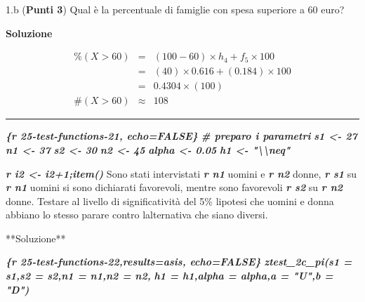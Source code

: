\documentclass[
  11pt,
]{book}
\newenvironment{Shaded}{\begin{snugshade}}{\end{snugshade}}
\newcommand{\InformationTok}[1]{\textcolor[rgb]{0.56,0.35,0.01}{\textbf{\textit{#1}}}}
\newcommand{\NormalTok}[1]{#1}
\theoremstyle{mytheoremstyle}
\theoremstyle{mydefstyle}
\begin{document}
1.b (\textbf{Punti 3}) Qual è la percentuale di famiglie con spesa superiore a 60 euro?

\textbf{Soluzione}

\begin{eqnarray*}
     \%(X> 60 ) &=& ( 100 - 60 )\times h_{ 4 }+ f_{ 5 }\times 100 \\
              &=& ( 40 )\times 0.616 + ( 0.184 )\times 100 \\
              &=&  0.4304 \times(100)\\
     \#(X> 60 ) &\approx& 108 
         \end{eqnarray*}

\begin{center}\rule{0.5\linewidth}{0.5pt}\end{center}

\begin{Shaded}
\begin{Highlighting}[]
\InformationTok{\textasciigrave{}\textasciigrave{}\textasciigrave{}\{r 25{-}test{-}functions{-}21, echo=FALSE\} }
\InformationTok{\# preparo i parametri}
\InformationTok{s1 \textless{}{-} 27}
\InformationTok{n1 \textless{}{-} 37}
\InformationTok{s2 \textless{}{-} 30}
\InformationTok{n2 \textless{}{-} 45}
\InformationTok{alpha \textless{}{-} 0.05}
\InformationTok{h1 \textless{}{-} "\textbackslash{}\textbackslash{}neq"}
\InformationTok{\textasciigrave{}\textasciigrave{}\textasciigrave{}}

\InformationTok{\textasciigrave{}r i2 \textless{}{-} i2+1;item()\textasciigrave{}}\NormalTok{ Sono stati intervistati }\InformationTok{\textasciigrave{}r n1\textasciigrave{}}\NormalTok{ uomini }
\NormalTok{e }\InformationTok{\textasciigrave{}r n2\textasciigrave{}}\NormalTok{ donne, }\InformationTok{\textasciigrave{}r s1\textasciigrave{}}\NormalTok{ su }\InformationTok{\textasciigrave{}r n1\textasciigrave{}}\NormalTok{ uomini si sono }
\NormalTok{dichiarati favorevoli, mentre sono favorevoli }\InformationTok{\textasciigrave{}r s2\textasciigrave{}}\NormalTok{ su }\InformationTok{\textasciigrave{}r n2\textasciigrave{}} 
\NormalTok{donne. Testare al livello di significatività del 5\% l\textquotesingle{}ipotesi che uomini e }
\NormalTok{donna abbiano lo stesso parare contro l\textquotesingle{}alternativa che siano diversi.}

\NormalTok{**Soluzione**}

\InformationTok{\textasciigrave{}\textasciigrave{}\textasciigrave{}\{r 25{-}test{-}functions{-}22,results=\textquotesingle{}asis\textquotesingle{}, echo=FALSE\} }
\InformationTok{ztest\_2c\_pi(s1 = s1,s2 = s2,n1 = n1,n2 = n2,}
\InformationTok{                h1 = h1,alpha = alpha,a = "U",b = "D")}
\InformationTok{\textasciigrave{}\textasciigrave{}\textasciigrave{}}


\end{Highlighting}
\end{Shaded}
\end{document}
